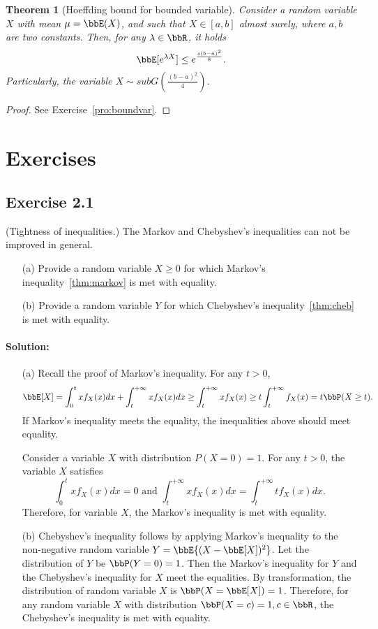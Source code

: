 \documentclass[11pt]{article}
\theoremstyle{plain}
\newtheorem{thm}{Theorem}[section]
\theoremstyle{definition}
\begin{document}
\begin{thm}[Hoeffding bound for bounded variable]\label{thm:boundvar}
Consider a random variable $X$ with mean $\mu = \bbE(X)$, and such that $X \in [a,b]$ almost surely, where $a, b$ are two constants. Then, for any $\lambda \in \bbR$, it holds
\begin{equation}
	\bbE[e^{\lambda X}] \leq e^{\frac{s(b-a)^2}{8}}.
\end{equation}
Particularly, the variable $X \sim subG(\frac{(b-a)^2}{4})$.
\end{thm}

\begin{proof}
	See Exercise~\ref{pro:boundvar}.
\end{proof}


\section{Exercises}

\subsection{Exercise 2.1} (Tightness of inequalities.) The Markov and Chebyshev's inequalities can not be improved in general. 
\begin{enumerate}
	\item[(a)] Provide a random variable $X \geq 0$ for which Markov's inequality~\eqref{thm:markov} is met with equality.  
	\item[(b)] Provide a random variable $Y$ for which Chebyshev's inequality~\eqref{thm:cheb} is met with equality.  
\end{enumerate}

\paragraph{Solution:} 
\begin{enumerate}
	\item[(a)] Recall the proof of Markov's inequality. For any $t >0$,
	\[ \bbE[X] = \int_{0}^t x f_X(x) dx + \int_{t}^{+\infty} x f_X(x) dx \geq \int_{t}^{+\infty} x f_X(x)\geq t \int_{t}^{+\infty} f_X(x) = t \bbP( X \geq t).\]
	 If Markov's inequality meets the equality, the inequalities above should meet equality. 
	 
	 Consider a variable $X$ with distribution $P(X = 0) = 1$. For any $t > 0$, the variable $X$ satisfies 
	 \[ \int_{0}^t x f_X(x) dx = 0 \text{ and } \int_{t}^{+\infty} x f_X(x) dx =\int_{t}^{+\infty} t f_X(x) dx. \]
	 Therefore, for variable $X$, the Markov's inequality is met with equality.
	 \item[(b)] Chebyshev's inequality follows by applying Markov's inequality to the non-negative random variable $Y = \bbE{(X - \bbE[X])^2}$. Let the distribution of $Y$ be $\bbP(Y = 0) = 1$. Then the Markov's inequality for $Y$ and the Chebyshev's inequality for $X$ meet the equalities. By transformation, the distribution of random variable $X$ is $\bbP(X = \bbE[X]) = 1$. Therefore, for any random variable $X$ with distribution $\bbP(X = c) = 1, c \in \bbR$, the Chebyshev's inequality is met with equality.
\end{enumerate}
\end{document}
